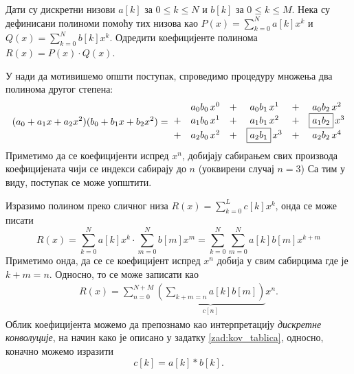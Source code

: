 \mnAdvanced \PID
Дати су дискретни низови $a[k]$ за $0 \leq k \leq N$ и $b[k]$ за $0 \leq k \leq M$. Нека су дефинисани полиноми 
помоћу тих низова као $P(x) = \sum_{k = 0}^{N} a[k] x^k$ и $Q(x) = \sum_{k = 0}^{N} b[k] x^k$. Одредити 
коефицијенте полинома $R(x) = P(x) \cdot Q(x)$.

\RESENJE

\noindent 

У нади да мотивишемо општи поступак, спроведимо процедуру множења два полинома другог степена: 
\begin{eqnarray}
    (a_0 + a_1 x + a_2 x^2) (b_0 + b_1 x + b_2 x^2) &=& \hspace*{-5mm}
    \begin{matrix}
        & & a_0b_0\, x^0  &+& a_0b_1\, x^1 &+& a_0b_2\, x^2 \\
        &+& a_1b_0\, x^1  &+& a_1b_1\, x^2 &+& \boxed{a_1b_2}\, x^3 \\
        &+& a_2b_0\, x^2  &+& \boxed{a_2b_1}\, x^3 &+& a_2b_2\, x^4 \\
    \end{matrix} 
\end{eqnarray}
Приметимо да се коефицијенти испред $x^n$, добијају сабирањем свих производа коефицијената чији се индекси сабирају до $n$ 
(уоквирени случај $n=3$)
Са тим у виду, поступак се може уопштити.

Изразимо полином преко сличног низа $R(x) = \sum_{k=0}^{L} c[k] x^k$, онда се може писати
\begin{equation}
    R(x) = \sum_{k = 0}^{N} a[k] x^k \cdot  \sum_{m = 0}^{N} b[m] x^m = \sum_{k = 0}^{N}  \sum_{m = 0}^{N} a[k]b[m] x^{k+m}
\end{equation}
Приметимо онда, да се се коефицијент испред $x^n$ добија у свим сабирцима где је $k+m=n$. Односно, то се може записати као 
\begin{eqnarray}
    R(x) = \sum_{n = 0}^{N+M} \underbrace{\left( \sum_{k + m = n} a[k]b[m] \right)}_{c[n]} x^n.
\end{eqnarray}
Облик коефицијента можемо да препознамо као интерпретацију \textit{дискретне конволуције}, на начин како је описано у задатку 
\ref{zad:kov_tablica}, односно, коначно можемо изразити 
\begin{equation}
    c[k] = a[k] \ast b[k].
\end{equation}